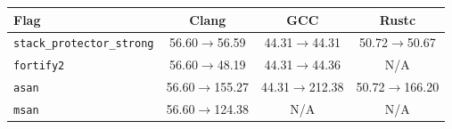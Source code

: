 \begin{tabular*}{\columnwidth}{@{\extracolsep\fill}lccc@{\extracolsep\fill}}
\toprule
\textbf{Flag} & \textbf{Clang} & \textbf{GCC} & \textbf{Rustc} \\
\midrule
\texttt{stack\_protector\_strong} & 56.60$\to$56.59 & 44.31$\to$44.31 & 50.72$\to$50.67 \\
\texttt{fortify2} & 56.60$\to$48.19 & 44.31$\to$44.36 & N/A \\
\texttt{asan} & 56.60$\to$155.27 & 44.31$\to$212.38 & 50.72$\to$166.20 \\
\texttt{msan} & 56.60$\to$124.38 & N/A & N/A \\
\bottomrule
\end{tabular*}
